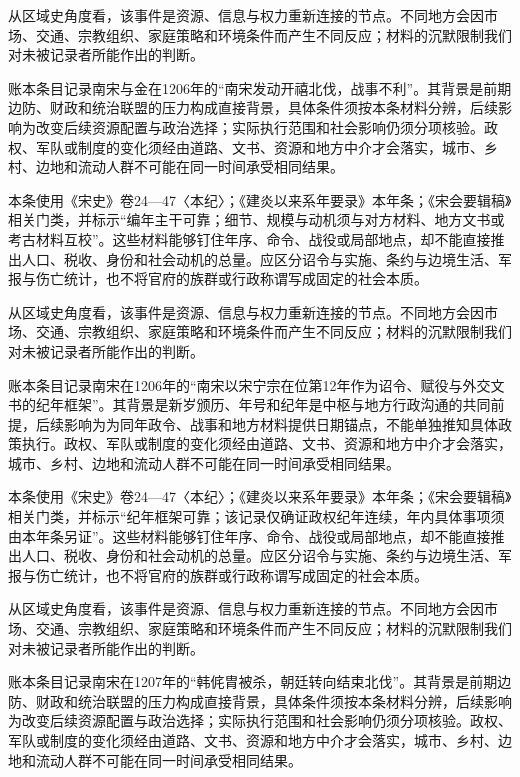 从区域史角度看，该事件是资源、信息与权力重新连接的节点。不同地方会因市场、交通、宗教组织、家庭策略和环境条件而产生不同反应；材料的沉默限制我们对未被记录者所能作出的判断。

账本条目记录南宋与金在1206年的“南宋发动开禧北伐，战事不利”。其背景是前期边防、财政和统治联盟的压力构成直接背景，具体条件须按本条材料分辨，后续影响为改变后续资源配置与政治选择；实际执行范围和社会影响仍须分项核验。政权、军队或制度的变化须经由道路、文书、资源和地方中介才会落实，城市、乡村、边地和流动人群不可能在同一时间承受相同结果。

本条使用《宋史》卷24—47〈本纪〉；《建炎以来系年要录》本年条；《宋会要辑稿》相关门类，并标示“编年主干可靠；细节、规模与动机须与对方材料、地方文书或考古材料互校”。这些材料能够钉住年序、命令、战役或局部地点，却不能直接推出人口、税收、身份和社会动机的总量。应区分诏令与实施、条约与边境生活、军报与伤亡统计，也不将官府的族群或行政称谓写成固定的社会本质。

从区域史角度看，该事件是资源、信息与权力重新连接的节点。不同地方会因市场、交通、宗教组织、家庭策略和环境条件而产生不同反应；材料的沉默限制我们对未被记录者所能作出的判断。

账本条目记录南宋在1206年的“南宋以宋宁宗在位第12年作为诏令、赋役与外交文书的纪年框架”。其背景是新岁颁历、年号和纪年是中枢与地方行政沟通的共同前提，后续影响为为同年政令、战事和地方材料提供日期锚点，不能单独推知具体政策执行。政权、军队或制度的变化须经由道路、文书、资源和地方中介才会落实，城市、乡村、边地和流动人群不可能在同一时间承受相同结果。

本条使用《宋史》卷24—47〈本纪〉；《建炎以来系年要录》本年条；《宋会要辑稿》相关门类，并标示“纪年框架可靠；该记录仅确证政权纪年连续，年内具体事项须由本年条另证”。这些材料能够钉住年序、命令、战役或局部地点，却不能直接推出人口、税收、身份和社会动机的总量。应区分诏令与实施、条约与边境生活、军报与伤亡统计，也不将官府的族群或行政称谓写成固定的社会本质。

从区域史角度看，该事件是资源、信息与权力重新连接的节点。不同地方会因市场、交通、宗教组织、家庭策略和环境条件而产生不同反应；材料的沉默限制我们对未被记录者所能作出的判断。

账本条目记录南宋在1207年的“韩侂胄被杀，朝廷转向结束北伐”。其背景是前期边防、财政和统治联盟的压力构成直接背景，具体条件须按本条材料分辨，后续影响为改变后续资源配置与政治选择；实际执行范围和社会影响仍须分项核验。政权、军队或制度的变化须经由道路、文书、资源和地方中介才会落实，城市、乡村、边地和流动人群不可能在同一时间承受相同结果。

